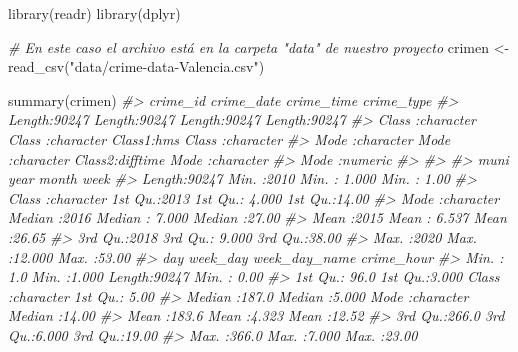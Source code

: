 \documentclass[
]{report}
\newenvironment{Shaded}{\begin{snugshade}}{\end{snugshade}}
\newcommand{\CommentTok}[1]{\textcolor[rgb]{0.56,0.35,0.01}{\textit{#1}}}
\newcommand{\FunctionTok}[1]{\textcolor[rgb]{0.00,0.00,0.00}{#1}}
\newcommand{\NormalTok}[1]{#1}
\newcommand{\OtherTok}[1]{\textcolor[rgb]{0.56,0.35,0.01}{#1}}
\newcommand{\StringTok}[1]{\textcolor[rgb]{0.31,0.60,0.02}{#1}}
\theoremstyle{definition}
\theoremstyle{definition}
\theoremstyle{definition}
\theoremstyle{definition}
\theoremstyle{remark}
\begin{document}
\begin{Shaded}
\begin{Highlighting}[]
\FunctionTok{library}\NormalTok{(readr)}
\FunctionTok{library}\NormalTok{(dplyr)}

\CommentTok{\# En este caso el archivo está en la carpeta "data" de nuestro proyecto}
\NormalTok{crimen }\OtherTok{\textless{}{-}} \FunctionTok{read\_csv}\NormalTok{(}\StringTok{"data/crime{-}data{-}Valencia.csv"}\NormalTok{)}


\FunctionTok{summary}\NormalTok{(crimen)}
\CommentTok{\#\textgreater{}    crime\_id          crime\_date         crime\_time        crime\_type       }
\CommentTok{\#\textgreater{}  Length:90247       Length:90247       Length:90247      Length:90247      }
\CommentTok{\#\textgreater{}  Class :character   Class :character   Class1:hms        Class :character  }
\CommentTok{\#\textgreater{}  Mode  :character   Mode  :character   Class2:difftime   Mode  :character  }
\CommentTok{\#\textgreater{}                                        Mode  :numeric                      }
\CommentTok{\#\textgreater{}                                                                            }
\CommentTok{\#\textgreater{}                                                                            }
\CommentTok{\#\textgreater{}      muni                year          month             week      }
\CommentTok{\#\textgreater{}  Length:90247       Min.   :2010   Min.   : 1.000   Min.   : 1.00  }
\CommentTok{\#\textgreater{}  Class :character   1st Qu.:2013   1st Qu.: 4.000   1st Qu.:14.00  }
\CommentTok{\#\textgreater{}  Mode  :character   Median :2016   Median : 7.000   Median :27.00  }
\CommentTok{\#\textgreater{}                     Mean   :2015   Mean   : 6.537   Mean   :26.65  }
\CommentTok{\#\textgreater{}                     3rd Qu.:2018   3rd Qu.: 9.000   3rd Qu.:38.00  }
\CommentTok{\#\textgreater{}                     Max.   :2020   Max.   :12.000   Max.   :53.00  }
\CommentTok{\#\textgreater{}       day           week\_day     week\_day\_name        crime\_hour   }
\CommentTok{\#\textgreater{}  Min.   :  1.0   Min.   :1.000   Length:90247       Min.   : 0.00  }
\CommentTok{\#\textgreater{}  1st Qu.: 96.0   1st Qu.:3.000   Class :character   1st Qu.: 5.00  }
\CommentTok{\#\textgreater{}  Median :187.0   Median :5.000   Mode  :character   Median :14.00  }
\CommentTok{\#\textgreater{}  Mean   :183.6   Mean   :4.323                      Mean   :12.52  }
\CommentTok{\#\textgreater{}  3rd Qu.:266.0   3rd Qu.:6.000                      3rd Qu.:19.00  }
\CommentTok{\#\textgreater{}  Max.   :366.0   Max.   :7.000                      Max.   :23.00  }

\end{Highlighting}
\end{Shaded}
\end{document}
